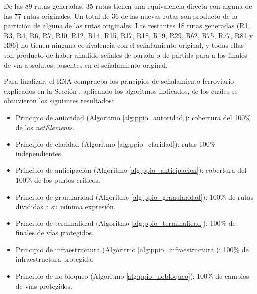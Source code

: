     De las 89 rutas generadas, 35 rutas tienen una equivalencia directa con alguna de las 77 rutas originales. Un total de 36 de las nuevas rutas son producto de la partición de alguna de las rutas originales. Las restantes 18 rutas generadas (R1, R3, R4, R6, R7, R10, R12, R14, R15, R17, R18, R19, R29, R62, R75, R77, R81 y R86) no tienen ninguna equivalencia con el señalamiento original, y todas ellas son producto de haber añadido señales de parada o de partida para a los finales de vía absolutos, ausentes en el señalamiento original.
    
    Para finalizar, el RNA comprueba los principios de señalamiento ferroviario explicados en la Sección \label{sec:validar_principios}, aplicando los algoritmos indicados, de los cuáles se obtuvieron los siguientes resultados:
    
    \begin{itemize}
    	\item Principio de autoridad (Algoritmo \ref{alg:ppio_autoridad}): cobertura del 100\% de los \textit{netElements}.
    	\item Principio de claridad (Algoritmo \ref{alg:ppio_claridad}): rutas 100\% independientes.
    	\item Principio de anticipación (Algoritmo \ref{alg:ppio_anticipacion}): cobertura del 100\% de los puntos críticos.
    	\item Principio de granularidad (Algoritmo \ref{alg:ppio_granularidad}): 100\% de rutas divididas a su mínima expresión.
    	\item Principio de terminalidad (Algoritmo \ref{alg:ppio_terminalidad}): 100\% de finales de vías protegidos.
    	\item Principio de infraestructura (Algoritmo \ref{alg:ppio_infraestructura}): 100\% de infraestructura protegida.
    	\item Principio de no bloqueo (Algoritmo \ref{alg:ppio_nobloqueo}): 100\% de cambios de vías protegidos.
    \end{itemize}	
    